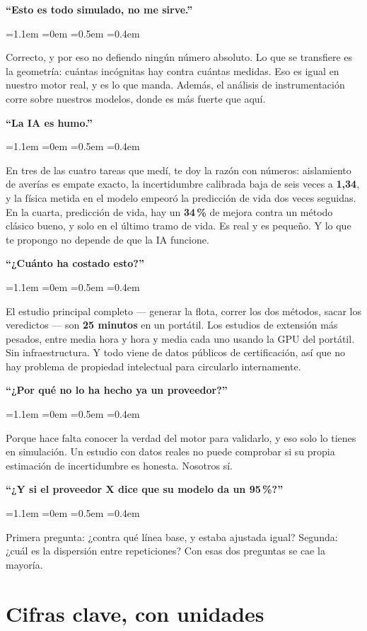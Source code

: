 \documentclass[11pt,a4paper]{article}
\newenvironment{decir}%
  {\begin{list}{}{\leftmargin=1.1em \rightmargin=0em \listparindent=0pt
       \itemindent=0pt \parsep=0.5em \topsep=0.4em}\item[]\ignorespaces}%
  {\end{list}}
\newcommand{\cifra}[1]{\textbf{#1}}
\begin{document}
\textbf{``Esto es todo simulado, no me sirve.''}
\begin{decir}
Correcto, y por eso no defiendo ningún número absoluto. Lo que se transfiere es la
geometría: cuántas incógnitas hay contra cuántas medidas. Eso es igual en nuestro motor
real, y es lo que manda. Además, el análisis de instrumentación corre sobre nuestros
modelos, donde es más fuerte que aquí.
\end{decir}

\textbf{``La IA es humo.''}
\begin{decir}
En tres de las cuatro tareas que medí, te doy la razón con números: aislamiento de
averías es empate exacto, la incertidumbre calibrada baja de seis veces a
\cifra{1,34}, y la física metida en el modelo empeoró la predicción de vida dos veces
seguidas. En la cuarta, predicción de vida, hay un \cifra{34\,\%} de mejora contra un
método clásico bueno, y solo en el último tramo de vida. Es real y es pequeño. Y lo que te
propongo no depende de que la IA funcione.
\end{decir}

\textbf{``¿Cuánto ha costado esto?''}
\begin{decir}
El estudio principal completo --- generar la flota, correr los dos métodos, sacar los
veredictos --- son \cifra{25 minutos} en un portátil. Los estudios de extensión más
pesados, entre media hora y hora y media cada uno usando la GPU del portátil. Sin
infraestructura. Y todo viene de datos públicos de certificación, así que no hay problema
de propiedad intelectual para circularlo internamente.
\end{decir}

\textbf{``¿Por qué no lo ha hecho ya un proveedor?''}
\begin{decir}
Porque hace falta conocer la verdad del motor para validarlo, y eso solo lo tienes en
simulación. Un estudio con datos reales no puede comprobar si su propia estimación de
incertidumbre es honesta. Nosotros sí.
\end{decir}

\textbf{``¿Y si el proveedor X dice que su modelo da un 95\,\%?''}
\begin{decir}
Primera pregunta: ¿contra qué línea base, y estaba ajustada igual? Segunda: ¿cuál es la
dispersión entre repeticiones? Con esas dos preguntas se cae la mayoría.
\end{decir}

\section*{Cifras clave, con unidades}
\end{document}
